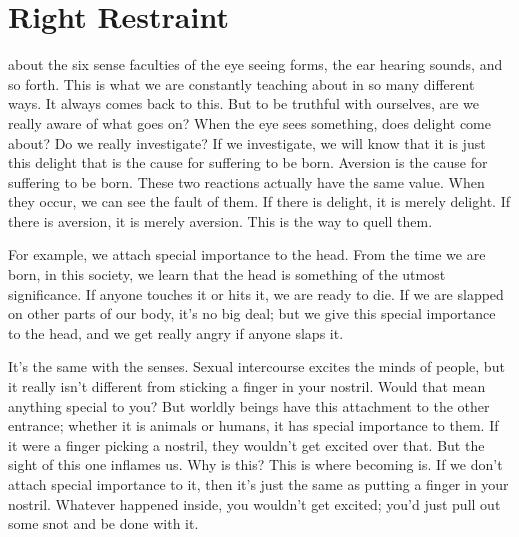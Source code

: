 

\chapter{Right Restraint}

 about the six sense faculties of the eye seeing forms, the ear hearing sounds, and so forth. This is what we are constantly teaching about in so many different ways. It always comes back to this. But to be truthful with ourselves, are we really aware of what goes on? When the eye sees something, does delight come about? Do we really investigate? If we investigate, we will know that it is just this delight that is the cause for suffering to be born. Aversion is the cause for suffering to be born. These two reactions actually have the same value. When they occur, we can see the fault of them. If there is delight, it is merely delight. If there is aversion, it is merely aversion. This is the way to quell them.

For example, we attach special importance to the head. From the time we are born, in this society, we learn that the head is something of the utmost significance. If anyone touches it or hits it, we are ready to die. If we are slapped on other parts of our body, it's no big deal; but we give this special importance to the head, and we get really angry if anyone slaps it.

It's the same with the senses. Sexual intercourse excites the minds of people, but it really isn't different from sticking a finger in your nostril. Would that mean anything special to you? But worldly beings have this attachment to the other entrance; whether it is animals or humans, it has special importance to them. If it were a finger picking a nostril, they wouldn't get excited over that. But the sight of this one inflames us. Why is this? This is where becoming is. If we don't attach special importance to it, then it's just the same as putting a finger in your nostril. Whatever happened inside, you wouldn't get excited; you'd just pull out some snot and be done with it.


